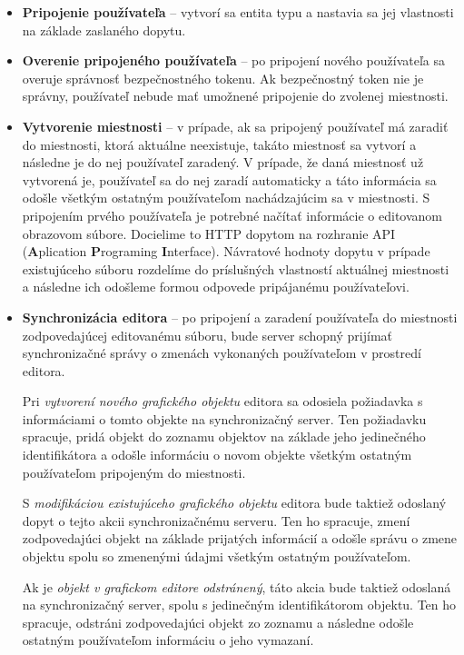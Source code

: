 \begin{itemize}
	\item \textbf{Pripojenie používateľa} -- vytvorí sa entita typu  a nastavia sa jej vlastnosti na základe zaslaného dopytu. 
	
	\item \textbf{Overenie pripojeného používateľa} -- po pripojení nového používateľa sa overuje správnosť bezpečnostného tokenu. Ak bezpečnostný token nie je správny, používateľ nebude mať umožnené pripojenie do zvolenej miestnosti.
	
	\item \textbf{Vytvorenie miestnosti} -- v prípade, ak sa pripojený používateľ má zaradiť do miestnosti, ktorá aktuálne neexistuje, takáto miestnosť sa vytvorí a následne je do nej používateľ zaradený. V prípade, že daná miestnosť už vytvorená je, používateľ sa do nej zaradí automaticky a táto informácia sa odošle všetkým ostatným používateľom nachádzajúcim sa v miestnosti. S pripojením prvého používateľa je potrebné načítať informácie o editovanom obrazovom súbore. Docielime to HTTP dopytom na rozhranie API (\textbf{A}plication \textbf{P}rograming \textbf{I}nterface). Návratové hodnoty dopytu v prípade existujúceho súboru rozdelíme do príslušných vlastností aktuálnej miestnosti a následne ich odošleme formou odpovede pripájanému používateľovi.
	
	\item \textbf{Synchronizácia editora} -- po pripojení a zaradení používateľa do miestnosti zodpovedajúcej editovanému súboru, bude server schopný prijímať synchronizačné správy o zmenách vykonaných používateľom v prostredí editora. 
	
	Pri \textit{vytvorení nového grafického objektu} editora sa odosiela požiadavka s informáciami o tomto objekte na synchronizačný server. Ten požiadavku spracuje, pridá objekt do zoznamu objektov na základe jeho jedinečného identifikátora a odošle informáciu o novom objekte všetkým ostatným používateľom pripojeným do miestnosti.
	
	S \textit{modifikáciou existujúceho grafického objektu} editora bude taktiež odoslaný dopyt o tejto akcii synchronizačnému serveru. Ten ho spracuje, zmení zodpovedajúci objekt na základe prijatých informácií a odošle správu o zmene objektu spolu so zmenenými údajmi všetkým ostatným používateľom.
	
	Ak je \textit{objekt v grafickom editore odstránený}, táto akcia bude taktiež odoslaná na synchronizačný server, spolu s jedinečným identifikátorom objektu. Ten ho spracuje, odstráni zodpovedajúci objekt zo zoznamu a následne odošle ostatným používateľom informáciu o jeho vymazaní.
	

\end{itemize}
